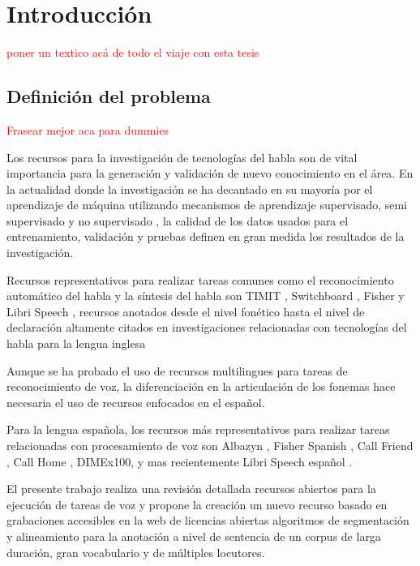 \chapter{Introducción}

\textcolor{red}{poner un textico acá de todo el viaje con esta tesis}

\section{Definición del problema}

\textcolor{red}{Frasear mejor aca para dummies}

Los recursos para la investigación de tecnologías del habla son de vital importancia para la generación y validación de nuevo conocimiento en el área. En la actualidad donde la investigación se ha decantado en su mayoría por el aprendizaje de máquina utilizando mecanismos de aprendizaje supervisado, semi supervisado y no supervisado \cite{Chiu2018} \cite{AmazonSemiSupervised}  \cite{ZeroResources} , la calidad de los datos usados para el entrenamiento, validación y pruebas definen en gran medida los resultados de la investigación.

Recursos representativos para realizar tareas comunes como el reconocimiento automático del habla y la síntesis del habla son TIMIT \cite{PriceTheRecognition}, Switchboard \cite{Godfrey1992SWITCHBOARD:Development}, Fisher \cite{CieriTheSpeech-to-Text} y Libri Speech \cite{PanayotovLIBRISPEECH:BOOKS}, recursos anotados desde el nivel fonético hasta el nivel de declaración altamente citados en investigaciones relacionadas con tecnologías del habla para la lengua inglesa


Aunque se ha probado el uso de recursos multilingues para tareas de reconocimiento de voz, la diferenciación en la articulación de los fonemas hace necesaria el uso de recursos enfocados en el español. 

Para la lengua española, los recursos más representativos para realizar tareas relacionadas con procesamiento de voz son Albazyn \cite{CampilloAlbayzinEvaluation}, Fisher Spanish \cite{FischerSpa}, Call Friend \cite{CALLFRIENDSpa}, Call Home \cite{CALLHOMESpa}, DIMEx100\cite{Pineda2004DIMEx100:Spanish}, y mas recientemente Libri Speech español \cite{LibriVox-Spanish}.



El presente trabajo realiza una revisión detallada  recursos abiertos para la ejecución de tareas de voz y propone la creación  un nuevo recurso basado en grabaciones accesibles en la web de licencias abiertas algoritmos de segmentación y alineamiento para la anotación a nivel de sentencia de un corpus de larga duración, gran vocabulario y de múltiples locutores.


